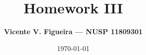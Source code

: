 \documentclass[a4paper, 12pt]{article}
\title{\textbf{Homework III}}
\author{\textbf{Vicente V. Figueira --- NUSP 11809301}}
\date{\today}
\theoremstyle{dotless}
\numberwithin{equation}{section}
\theoremstyle{dotless}
\renewcommand{\thesubsection}{\thesection.\Alph{subsection})}
\begin{document}
\maketitle

\tableofcontents



\newpage



\newpage



\newpage

\renewcommand{\thesubsection}{\thesection.\arabic{subsection}}

\appendix



\newpage



\newpage


\end{document}
